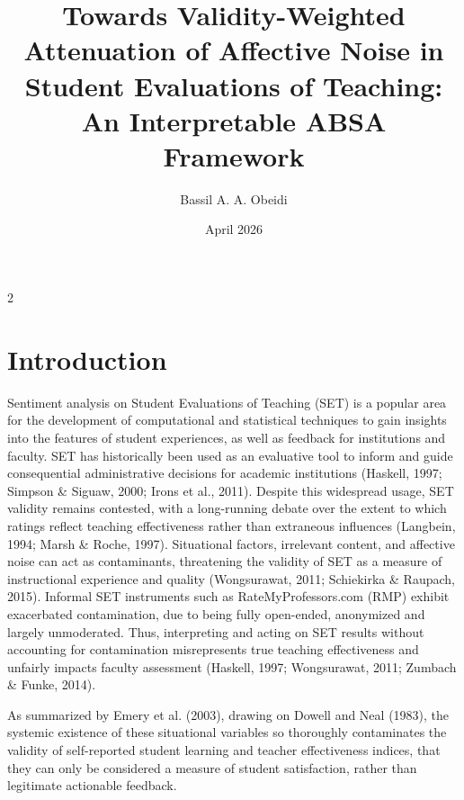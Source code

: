 \documentclass{article}
\title{Towards Validity-Weighted Attenuation of Affective Noise in Student Evaluations of Teaching: An Interpretable ABSA Framework}
\author{Bassil A. A. Obeidi}
\date{April 2026}
\begin{document}
\maketitle

\begin{multicols*}{2}

\section{Introduction}
Sentiment analysis on Student Evaluations of Teaching (SET) is a popular area for the development of computational and statistical techniques to gain insights into the features of student experiences, as well as feedback for institutions and faculty. SET has historically been used as an evaluative tool to inform and guide consequential administrative decisions for academic institutions (Haskell, 1997; Simpson \& Siguaw, 2000; Irons et al., 2011). Despite this widespread usage, SET validity remains contested, with a long-running debate over the extent to which ratings reflect teaching effectiveness rather than extraneous influences (Langbein, 1994; Marsh \& Roche, 1997). Situational factors, irrelevant content, and affective noise can act as contaminants, threatening the validity of SET as a measure of instructional experience and quality (Wongsurawat, 2011; Schiekirka \& Raupach, 2015). Informal SET instruments such as RateMyProfessors.com (RMP) exhibit exacerbated contamination, due to being fully open-ended, anonymized and largely unmoderated. Thus, interpreting and acting on SET results without accounting for contamination misrepresents true teaching effectiveness and unfairly impacts faculty assessment (Haskell, 1997; Wongsurawat, 2011; Zumbach \& Funke, 2014).

As summarized by Emery et al. (2003), drawing on Dowell and Neal (1983), the systemic existence of these situational variables so thoroughly contaminates the validity of self-reported student learning and teacher effectiveness indices, that they can only be considered a measure of student satisfaction, rather than legitimate actionable feedback. 


\end{multicols*}
\end{document}
